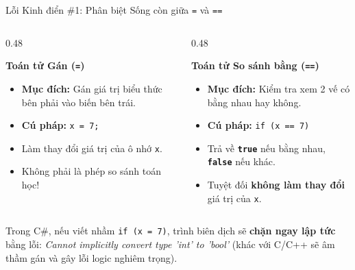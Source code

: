 \documentclass[aspectratio=169, 10pt]{beamer}
\begin{document}
\begin{frame}[fragile]{Lỗi Kinh điển \#1: Phân biệt Sống còn giữa \texttt{=} và \texttt{==}}
  \begin{columns}[T]
    \begin{column}{0.48\textwidth}
      \begin{alertblock}{\textbf{Toán tử Gán (\texttt{=})}}
        \begin{itemize}\small
          \item \textbf{Mục đích:} Gán giá trị biểu thức bên phải vào biến bên trái.
          \item \textbf{Cú pháp:} \texttt{x = 7;}
          \item Làm thay đổi giá trị của ô nhớ \texttt{x}.
          \item Không phải là phép so sánh toán học!
        \end{itemize}
      \end{alertblock}
    \end{column}

    \begin{column}{0.48\textwidth}
      \begin{exampleblock}{\textbf{Toán tử So sánh bằng (\texttt{==})}}
        \begin{itemize}\small
          \item \textbf{Mục đích:} Kiểm tra xem 2 vế có bằng nhau hay không.
          \item \textbf{Cú pháp:} \texttt{if (x == 7)}
          \item Trả về \textbf{\texttt{true}} nếu bằng nhau, \textbf{\texttt{false}} nếu khác.
          \item Tuyệt đối \textbf{không làm thay đổi} giá trị của \texttt{x}.
        \end{itemize}
      \end{exampleblock}
    \end{column}
  \end{columns}
  \vspace{2mm}
  \begin{tcolorbox}[colback=UniOrange!10,colframe=UniOrange,title=\textbf{Bẫy cú pháp cần ghi nhớ suốt sự nghiệp kỹ sư:}]
    Trong C\#, nếu viết nhầm \texttt{if (x = 7)}, trình biên dịch sẽ \textbf{chặn ngay lập tức} bằng lỗi: \textit{Cannot implicitly convert type 'int' to 'bool'} (khác với C/C++ sẽ âm thầm gán và gây lỗi logic nghiêm trọng).
  \end{tcolorbox}
\end{frame}
\end{document}
